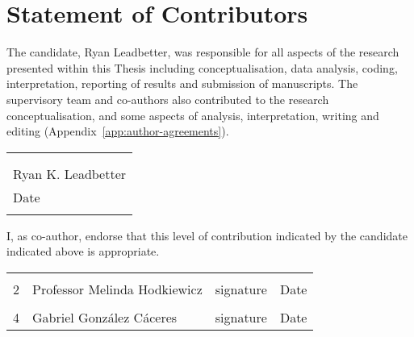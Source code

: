 \chapter*{Statement of Contributors} 

The candidate, Ryan Leadbetter, was responsible for all aspects of the research presented within this Thesis including conceptualisation, data analysis, coding, interpretation, reporting of results and submission of manuscripts. The supervisory team and co-authors also contributed to the research conceptualisation, and some aspects of analysis, interpretation, writing and editing (Appendix~\ref{app:author-agreements}).

\vspace{25mm}
\begin{tabular}{@{}p{2.5in}@{}}
\hrulefill \\
\\
Ryan K. Leadbetter \\
Date\\
\\
\end{tabular}

I, as co-author, endorse that this level of contribution indicated by the candidate indicated above is appropriate.

\begin{table}
  \centering
  \begin{tabularx}{\textwidth}{lYYY}
  \toprule
   &  &  & \\
  2 & Professor Melinda Hodkiewicz & signature & Date\\
   &  &  & \\
  4 & Gabriel Gonz\'{a}lez C\'{a}ceres & signature & Date\\

  \bottomrule
  \end{tabularx}
\end{table}

